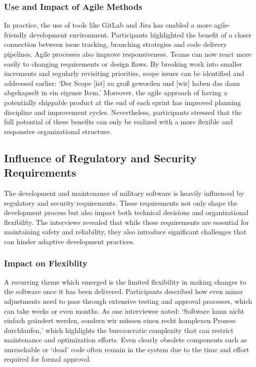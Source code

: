 \subsubsection{Use and Impact of Agile Methods}
In practice, the use of tools like GitLab and Jira has enabled a more agile-friendly development environment. Participants highlighted the benefit of a closer connection between issue tracking, branching strategies and code delivery pipelines. 
Agile processes also improve responsiveness. Teams can now react more easily to changing requirements or design flaws. By breaking work into smaller increments and regularly revisiting priorities, scope issues can be identified and addressed earlier:
`Der Scope [ist] zu groß geworden und [wir] haben das dann abgekapselt in ein eigenes Item.' Moreover, the agile approach of having a potentially shippable product at the end of each sprint has improved planning discipline and improvement cycles.
Nevertheless, participants stressed that the full potential of these benefits can only be realized with a more flexible and responsive organizational structure.\\

\subsection{Influence of Regulatory and Security Requirements}
The development and maintenance of military software is heavily influenced by regulatory and security requirements. These requirements not only shape the development process but also impact both technical decisions and organizational flexibility.
The interviews revealed that while these requirements are essential for maintaining safety and reliability, they also introduce significant challenges that can hinder adaptive development practices.

\subsubsection{Impact on Flexiblity}
A recurring theme which emerged is the limited flexibility in making changes to the software once it has been delivered. Participants described how even minor adjustments need to pass through extensive testing and approval processes, which can take weeks or even months.
As one interviewee noted: `Software kann nicht einfach geändert werden, sondern wir müssen einen recht komplexen Prozess durchlaufen,' which highlights the bureaucratic complexity that can restrict maintenance and optimization efforts. Even clearly obsolete components such as unreachable or `dead' code
often remain in the system due to the time and effort required for formal approval.\\


